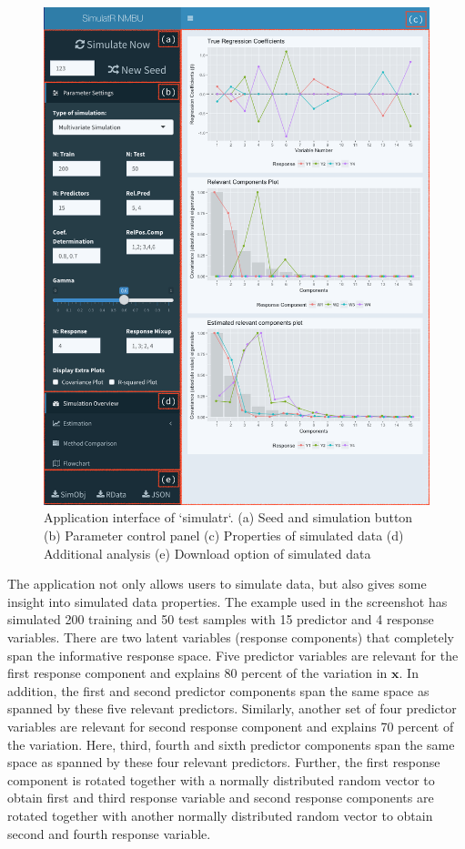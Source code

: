 \documentclass[num-refs]{wiley-article}
\begin{document}
\begin{figure}[!htb]

{\centering \includegraphics[width=0.95\linewidth]{_bookdown_files/AppSimulatr} 

}

\caption{Application interface of `simulatr`. (a) Seed and simulation button (b) Parameter control panel (c) Properties of simulated data (d) Additional analysis (e) Download option of simulated data}\label{fig:AppSimulatr}
\end{figure}

The application not only allows users to simulate data, but also gives
some insight into simulated data properties. The example used in the
screenshot has simulated 200 training and 50 test samples with 15
predictor and 4 response variables. There are two latent variables
(response components) that completely span the informative response
space. Five predictor variables are relevant for the first response
component and explains 80 percent of the variation in \(\mathbf{x}\). In
addition, the first and second predictor components span the same space
as spanned by these five relevant predictors. Similarly, another set of
four predictor variables are relevant for second response component and
explains 70 percent of the variation. Here, third, fourth and sixth
predictor components span the same space as spanned by these four
relevant predictors. Further, the first response component is rotated
together with a normally distributed random vector to obtain first and
third response variable and second response components are rotated
together with another normally distributed random vector to obtain
second and fourth response variable.
\end{document}
